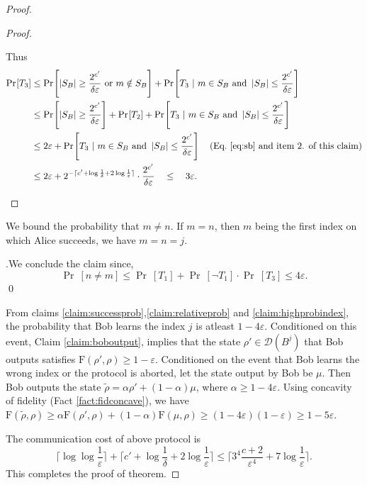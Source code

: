 \documentclass[11pt,a4paper]{article}
\def\F{\mathrn{F}}
\theoremstyle{plain}
\theoremstyle{definition}
\newcommand {\Br} [1] {\ensuremath{ \left[ #1 \right] }}
\newcommand {\minusspace} {\: \! \!}
\newcommand {\Fn} [2] {\ensuremath{ #1 \minusspace \Br{ #2 } }}
\newcommand {\prob} [1] {\Fn{\Pr}{#1}}
\newcommand {\abs} [1] {\ensuremath{ \left| #1 \right| }}
\def\ve{{\varepsilon}}
\def\F{\mathrm{F}}
\begin{document}
\begin{proof}
\begin{proof}
\begin{enumerate}
    Thus
    \begin{align*}
    \prob{T_3} & \leq\prob{\abs{S_B}\geq \frac{2^{c'}}{\delta\ve} \text{ or } m \notin S_B} +  \prob{T_3~|~m \in S_B \text{ and } \abs{S_B}\leq \frac{2^{c'}}{\delta\ve}} \\ & \leq \prob{\abs{S_B}\geq \frac{2^{c'}}{\delta\ve}} + \prob{T_2} + \prob{T_3~|~m \in S_B \text{ and } \abs{S_B}\leq \frac{2^{c'}}{\delta\ve}} \\
     & \leq 2 \ve+\prob{T_3~|~m \in S_B \text{ and } \abs{S_B}\leq \frac{2^{c'}}{\delta\ve}}  \quad \mbox{(Eq.~\eqref{eq:sb} and item 2. of this claim)}\\
     & \leq 2\ve + 2^{- \lceil c' + \log\frac{1}{\delta}+ 2\log\frac{1}{\ve}\rceil} \cdot \frac{2^{c'}}{\delta\ve} \quad  \leq \quad 3 \ve.
    \end{align*}

\end{enumerate}
\end{proof}



We bound the probability that $m\neq n$. If $m=n$, then $m$ being the first index on which Alice succeeds, we have $m=n=j$. 

\bigskip

.\quad We conclude the claim since,
$$\prob{n \neq m} \leq\prob{T_1}+\prob{\neg T_1}\cdot\prob{T_3}\leq 4\ve.$$ \qed

From claims \ref{claim:successprob},\ref{claim:relativeprob} and \ref{claim:highprobindex}, the probability that Bob learns the index $j$ is atleast $1-4\ve$. Conditioned on this event, Claim \ref{claim:boboutput}, implies that the state $\rho' \in \mathcal{D}(B^j)$ that Bob outputs satisfies $\F(\rho',\rho)\geq 1-\ve$. Conditioned on the event that Bob learns the wrong index or the protocol is aborted, let the state output by Bob be $\mu$. Then Bob outputs the state $\tilde{\rho}=\alpha\rho'+(1-\alpha)\mu$, where $\alpha\geq 1-4\ve$. Using concavity of fidelity (Fact \ref{fact:fidconcave}), we have $\F(\tilde{\rho},\rho)\geq \alpha\F(\rho',\rho)+(1-\alpha)\F(\mu,\rho) \geq (1-4\ve)(1-\ve)\geq 1- 5\ve$. 

The communication cost of above protocol is $$\lceil\log\log\frac{1}{\ve}\rceil+\lceil c' + \log\frac{1}{\delta} + 2\log\frac{1}{\ve}\rceil\leq \lceil 3^4\frac{c+2}{\ve^4}+7\log\frac{1}{\ve} \rceil.$$ This completes the proof of theorem.     
\end{proof}
\end{document}
